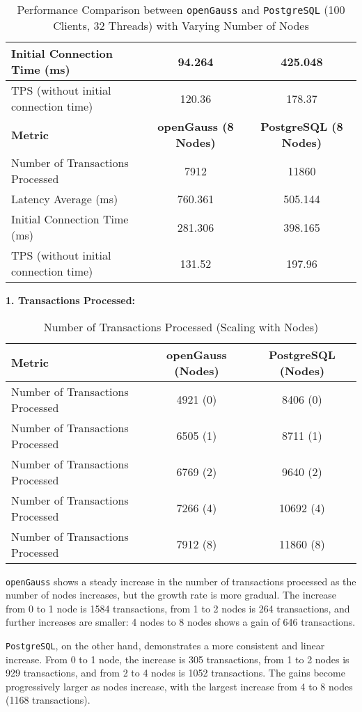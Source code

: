 \documentclass[12pt,a4paper,cs4size]{ctexart}
\begin{document}
\begin{table}[h!]
\begin{tabular}{|l|c|c|}
Initial Connection Time (ms) & 94.264 & 425.048 \\
\hline
TPS (without initial connection time) & 120.36 & 178.37 \\
\hline
\hline
\textbf{Metric} & \textbf{openGauss (8 Nodes)} & \textbf{PostgreSQL (8 Nodes)} \\
\hline
Number of Transactions Processed & 7912 & 11860 \\
\hline
Latency Average (ms) & 760.361 & 505.144 \\
\hline
Initial Connection Time (ms) & 281.306 & 398.165 \\
\hline
TPS (without initial connection time) & 131.52 & 197.96 \\
\hline
\end{tabular}
\caption{Performance Comparison between \texttt{openGauss} and \texttt{PostgreSQL} (100 Clients, 32 Threads) with Varying Number of Nodes}
\end{table}

\newpage

\textbf{1. Transactions Processed:}

\begin{table}[h!]
\centering
\captionsetup{labelformat=empty}
\begin{tabular}{|l|c|c|}
\hline
\textbf{Metric} & \textbf{openGauss (Nodes)} & \textbf{PostgreSQL (Nodes)} \\
\hline
Number of Transactions Processed & 4921 (0) & 8406 (0) \\
\hline
Number of Transactions Processed & 6505 (1) & 8711 (1) \\
\hline
Number of Transactions Processed & 6769 (2) & 9640 (2) \\
\hline
Number of Transactions Processed & 7266 (4) & 10692 (4) \\
\hline
Number of Transactions Processed & 7912 (8) & 11860 (8) \\
\hline
\end{tabular}
\caption{Number of Transactions Processed (Scaling with Nodes)}
\end{table}

\texttt{openGauss} shows a steady increase in the number of transactions processed as the number of nodes increases, but the growth rate is more gradual. The increase from 0 to 1 node is 1584 transactions, from 1 to 2 nodes is 264 transactions, and further increases are smaller: 4 nodes to 8 nodes shows a gain of 646 transactions.

\texttt{PostgreSQL}, on the other hand, demonstrates a more consistent and linear increase. From 0 to 1 node, the increase is 305 transactions, from 1 to 2 nodes is 929 transactions, and from 2 to 4 nodes is 1052 transactions. The gains become progressively larger as nodes increase, with the largest increase from 4 to 8 nodes (1168 transactions).
\end{document}
